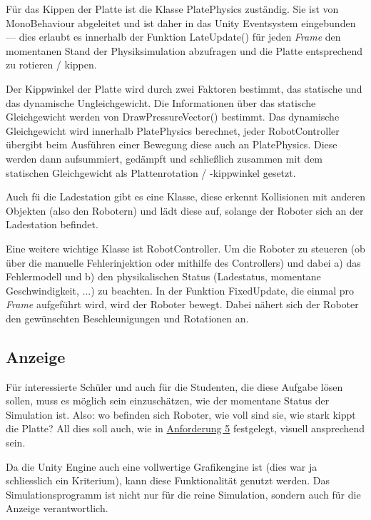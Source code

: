 F{\"{u}}r das Kippen der Platte ist die Klasse PlatePhysics zust{\"{a}}ndig. Sie ist von MonoBehaviour abgeleitet und ist daher
in das Unity Eventsystem eingebunden --- dies erlaubt es innerhalb der Funktion LateUpdate() f{\"{u}}r jeden \textit{\gls{Frame}} den momentanen
Stand der Physiksimulation abzufragen und die Platte entsprechend zu rotieren / kippen.

Der Kippwinkel der Platte wird durch zwei Faktoren bestimmt, das statische und das dynamische Ungleichgewicht. Die Informationen {\"{u}}ber
das statische Gleichgewicht werden von DrawPressureVector() bestimmt. Das dynamische Gleichgewicht wird innerhalb PlatePhysics berechnet,
jeder RobotController {\"{u}}bergibt beim Ausf{\"{u}}hren einer Bewegung diese auch an PlatePhysics. Diese werden dann aufsummiert, ged{\"{a}}mpft
und schlie{\ss}lich zusammen mit dem statischen Gleichgewicht als Plattenrotation / -kippwinkel gesetzt.

Auch f{\"{u}} die Ladestation gibt es eine Klasse, diese erkennt Kollisionen mit anderen Objekten (also den Robotern) und l{\"{a}}dt diese auf,
solange der Roboter sich an der Ladestation befindet.

Eine weitere wichtige Klasse ist RobotController. Um die Roboter zu steueren (ob {\"{u}}ber die manuelle Fehlerinjektion oder mithilfe des
Controllers) und dabei a) das Fehlermodell und b) den physikalischen Status (Ladestatus, momentane Geschwindigkeit, ...) zu beachten. In der
Funktion FixedUpdate, die einmal pro \textit{Frame} aufgef{\"{u}}hrt wird, wird der Roboter bewegt. Dabei n{\"{a}}hert sich der Roboter den
gew{\"{u}}nschten Beschleunigungen und Rotationen an.

\subsection{Anzeige}\label{graphics}
F{\"{u}}r interessierte Sch{\"{u}}ler und auch f{\"{u}}r die Studenten, die diese Aufgabe l{\"{o}}sen
sollen, muss es m{\"{o}}glich sein einzusch{\"{a}}tzen, wie der momentane Status der Simulation ist.
Also: wo befinden sich Roboter, wie voll sind sie, wie stark kippt die Platte? All dies soll auch, wie
in \hyperref[anforderung]{Anforderung 5} festgelegt, visuell ansprechend sein.

Da die Unity Engine auch eine vollwertige Grafikengine ist (dies war ja schliesslich ein Kriterium),
kann diese Funktionalit{\"{a}}t genutzt werden. Das Simulationsprogramm ist nicht nur f{\"{u}}r die
reine Simulation, sondern auch f{\"{u}}r die Anzeige verantwortlich.

